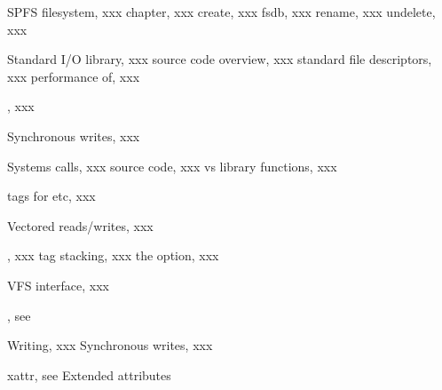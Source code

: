 \begin{theindex}
\indexspace
	\item SPFS filesystem, xxx
		\subitem chapter, xxx
		\subitem create, xxx
		\subitem fsdb, xxx
		\subitem rename, xxx
		\subitem undelete, xxx

\indexspace
	 \item Standard I/O library, xxx
	 	\subitem source code overview, xxx
	 	\subitem standard file descriptors, xxx
		\subitem performance of, xxx

\indexspace
	 \item {}, xxx

\indexspace
	 \item Synchronous writes, xxx

\indexspace
	 \item Systems calls, xxx
		\subitem source code, xxx
		\subitem vs library functions, xxx

\indexspace
	 \item tags for  etc, xxx

\indexspace
	\item Vectored reads/writes, xxx

\indexspace
	\item {}, xxx
		\subitem tag stacking, xxx
		\subitem the  option, xxx
		
\indexspace
	\item VFS interface, xxx

\indexspace
	 \item {}, see 

\indexspace
	 \item Writing, xxx
	 	\subitem Synchronous writes, xxx
\indexspace
	 \item xattr, see Extended attributes

\end{theindex}
